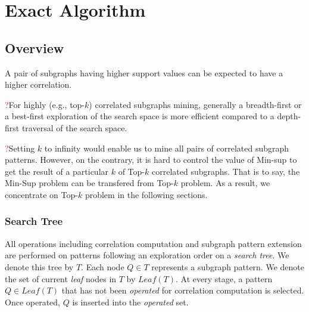 \chapter{Exact Algorithm}
\label{sec:exact_algo}

\section{Overview}
\label{subsec:exact_algo_overview}

\begin{observation}
	\label{ob:frequency}
	A pair of subgraphs having higher support values can be expected to 
	have a higher correlation.
\end{observation}

\begin{observation}
	\label{ob:dfs}
	\textcolor{red}{?}For highly (e.g., top-$k$) correlated subgraphs mining, generally a
	breadth-first or a best-first exploration of the search space is more
	efficient compared to a depth-first traversal of the search space.
\end{observation}

\textcolor{red}{?}Setting $k$ to infinity would enable us to mine all pairs of correlated subgraph
patterns. However, on the contrary, it is hard to control the value of {\sf
Min-sup} to get the result of a particular $k$ of {\sf Top-$k$} correlated
subgraphs. That is to say, the {\sf Min-Sup} problem can be transfered from {\sf
Top-$k$} problem. As a result, we concentrate on {\sf Top-$k$} problem in the
following sections.

\subsection{Search Tree}
\label{subsubsec:exact_algo_searchtree}
All operations including correlation computation and subgraph pattern extension
are performed on patterns following an exploration order on a \textit{search tree}.
We denote this tree by $T$. Each node $Q\in T$ represents a subgraph pattern. We
denote the set of current \textit{leaf} nodes in $T$ by $Leaf(T)$. At
every stage, a pattern $Q\in Leaf(T)$ that has not been \textit{operated} for correlation
computation is selected. Once operated, $Q$ is inserted into the
\textit{operated} set.


